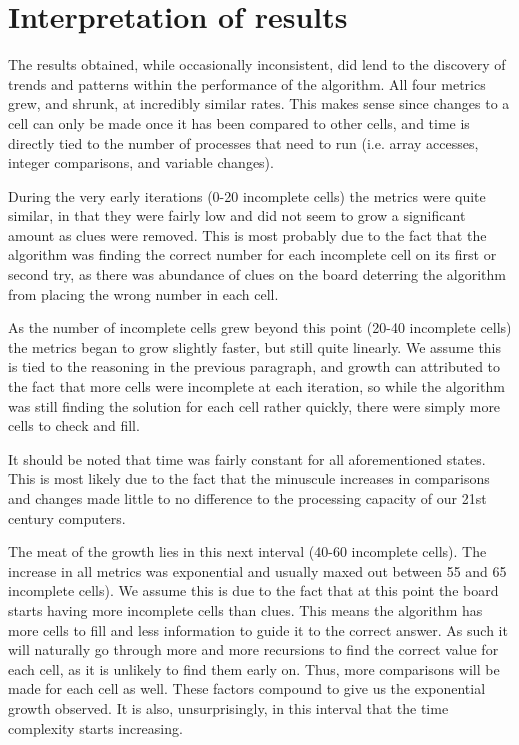 \documentclass{article}
\begin{document}
	\clearpage
    \pagebreak
    \section{Interpretation of results}
    The results obtained, while occasionally inconsistent, did lend to the discovery of trends and patterns within the performance of the algorithm. All four metrics grew, and shrunk, at incredibly similar rates. This makes sense since changes to a cell can only be made once it has been compared to other cells, and time is directly tied to the number of processes that need to run (i.e. array accesses, integer comparisons, and variable changes). 
        

    During the very early iterations (0-20 incomplete cells) the metrics were quite similar, in that they were fairly low and did not seem to grow a significant amount as clues were removed. This is most probably due to the fact that the algorithm was finding the correct number for each incomplete cell on its first or second try, as there was abundance of clues on the board deterring the algorithm from placing the wrong number in each cell. 
    
 
    As the number of incomplete cells grew beyond this point (20-40 incomplete cells) the metrics began to grow slightly faster, but still quite linearly. We assume this is tied to the reasoning in the previous paragraph, and growth can attributed to the fact that more cells were incomplete at each iteration, so while the algorithm was still finding the solution for each cell rather quickly, there were simply more cells to check and fill.


    It should be noted that time was fairly constant for all aforementioned states. This is most likely due to the fact that the minuscule increases in comparisons and changes made little to no difference to the processing capacity of our 21st century computers.


    The meat of the growth lies in this next interval (40-60 incomplete cells). The increase in all metrics was exponential and usually maxed out between 55 and 65 incomplete cells). We assume this is due to the fact that at this point the board starts having more incomplete cells than clues. This means the algorithm has more cells to fill and less information to guide it to the correct answer. As such it will naturally go through more and more recursions to find the correct value for each cell, as it is unlikely to find them early on. Thus, more comparisons will be made for each cell as well. These factors compound to give us the exponential growth observed. It is also, unsurprisingly, in this interval that the time complexity starts increasing.
\end{document}
